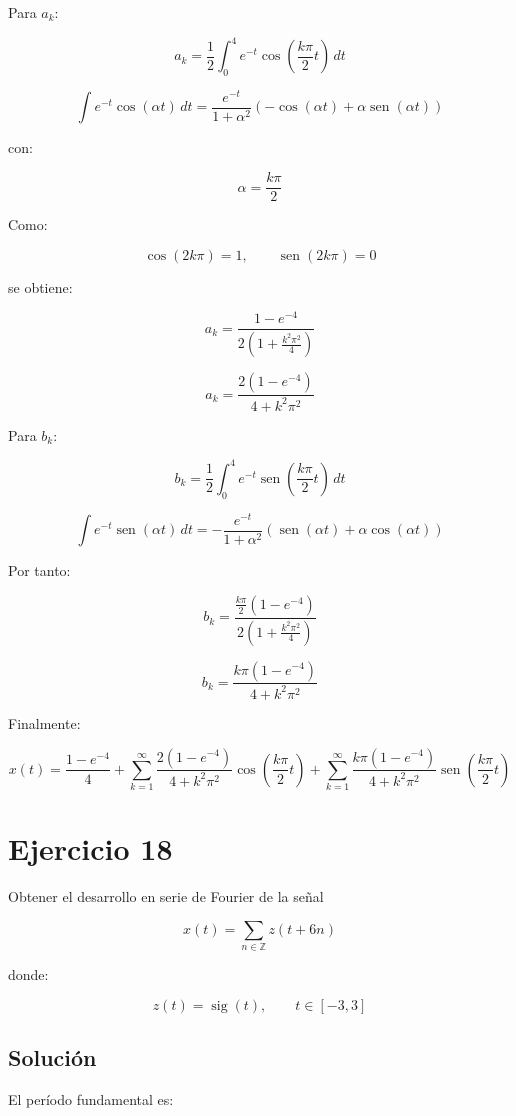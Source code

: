 \documentclass[fleqn]{article}
\DeclareMathOperator{\sen}{sen}
\begin{document}
	Para $a_k$:

	\[
	a_k
	=
	\frac{1}{2}
	\int_0^4
	e^{-t}
	\cos\left(\frac{k\pi}{2}t\right)\,dt
	\]

	\[
	\int
	e^{-t}\cos(\alpha t)\,dt
	=
	\frac{e^{-t}}{1+\alpha^2}
	\left(
	-\cos(\alpha t)+\alpha\sen(\alpha t)
	\right)
	\]

	con:

	\[
	\alpha=\frac{k\pi}{2}
	\]

	Como:

	\[
	\cos(2k\pi)=1,
	\qquad
	\sen(2k\pi)=0
	\]

	se obtiene:

	\[
	a_k
	=
	\frac{1-e^{-4}}
	{2\left(1+\frac{k^2\pi^2}{4}\right)}
	\]

	\[
	\boxed{
	a_k
	=
	\frac{2(1-e^{-4})}
	{4+k^2\pi^2}
	}
	\]

	Para $b_k$:

	\[
	b_k
	=
	\frac{1}{2}
	\int_0^4
	e^{-t}
	\sen\left(\frac{k\pi}{2}t\right)\,dt
	\]

	\[
	\int
	e^{-t}\sen(\alpha t)\,dt
	=
	-\frac{e^{-t}}{1+\alpha^2}
	\left(
	\sen(\alpha t)+\alpha\cos(\alpha t)
	\right)
	\]

	Por tanto:

	\[
	b_k
	=
	\frac{
	\frac{k\pi}{2}(1-e^{-4})
	}{
	2\left(1+\frac{k^2\pi^2}{4}\right)
	}
	\]

	\[
	\boxed{
	b_k
	=
	\frac{k\pi(1-e^{-4})}
	{4+k^2\pi^2}
	}
	\]

	Finalmente:

	\[
	\boxed{
	x(t)
	=
	\frac{1-e^{-4}}{4}
	+
	\sum_{k=1}^{\infty}
	\frac{2(1-e^{-4})}{4+k^2\pi^2}
	\cos\left(\frac{k\pi}{2}t\right)
	+
	\sum_{k=1}^{\infty}
	\frac{k\pi(1-e^{-4})}{4+k^2\pi^2}
	\sen\left(\frac{k\pi}{2}t\right)
	}
	\]

\section{Ejercicio 18}
	Obtener el desarrollo en serie de Fourier de la señal

	\[
	x(t)=\sum_{n\in\mathbb{Z}}z(t+6n)
	\]

	donde:

	\[
	z(t)=\operatorname{sig}(t),
	\qquad
	t\in[-3,3]
	\]

	\subsection{Solución}

	El período fundamental es:
\end{document}
